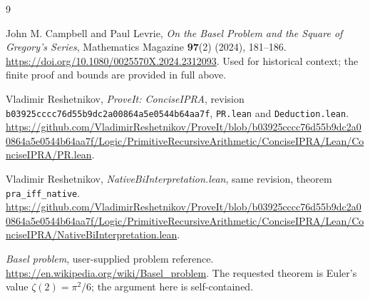 \documentclass[11pt,a4paper]{article}
\theoremstyle{remark}\newtheorem{remark}[theorem]{Remark}
\begin{document}
\begin{thebibliography}{9}
\raggedright
{}
John M. Campbell and Paul Levrie,
\emph{On the Basel Problem and the Square of Gregory's Series},
Mathematics Magazine \textbf{97}(2) (2024), 181--186.
\url{https://doi.org/10.1080/0025570X.2024.2312093}.
Used for historical context; the finite proof and bounds are
provided in full above.

Vladimir Reshetnikov, \emph{ProveIt: ConciseIPRA},
revision \texttt{b03925cccc76d55b9dc2a00864a5e0544b64aa7f},
\texttt{PR.lean} and \texttt{Deduction.lean}.
\url{https://github.com/VladimirReshetnikov/ProveIt/blob/b03925cccc76d55b9dc2a00864a5e0544b64aa7f/Logic/PrimitiveRecursiveArithmetic/ConciseIPRA/Lean/ConciseIPRA/PR.lean}.

Vladimir Reshetnikov, \emph{NativeBiInterpretation.lean},
same revision, theorem \texttt{pra\_iff\_native}.
\url{https://github.com/VladimirReshetnikov/ProveIt/blob/b03925cccc76d55b9dc2a00864a5e0544b64aa7f/Logic/PrimitiveRecursiveArithmetic/ConciseIPRA/Lean/ConciseIPRA/NativeBiInterpretation.lean}.

\emph{Basel problem}, user-supplied problem reference.
\url{https://en.wikipedia.org/wiki/Basel_problem}.
The requested theorem is Euler's value $\zeta(2)=\pi^2/6$;
the argument here is self-contained.
\end{thebibliography}
\end{document}
